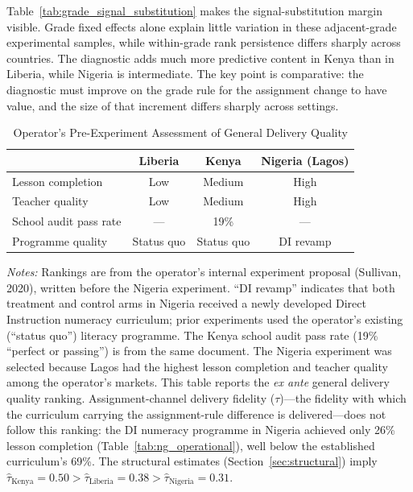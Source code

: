 \documentclass[11pt]{article}
\begin{document}
Table~\ref{tab:grade_signal_substitution} makes the signal-substitution margin visible. Grade fixed effects alone explain little variation in these adjacent-grade experimental samples, while within-grade rank persistence differs sharply across countries. The diagnostic adds much more predictive content in Kenya than in Liberia, while Nigeria is intermediate. The key point is comparative: the diagnostic must improve on the grade rule for the assignment change to have value, and the size of that increment differs sharply across settings.



\begin{table}[H]
\centering
\caption{Operator's Pre-Experiment Assessment of General Delivery Quality}
\label{tab:tau_summary}
\begin{threeparttable}
\begin{tabular}[t]{lccc}
\toprule
 & Liberia & Kenya & Nigeria (Lagos) \\
\midrule
Lesson completion & Low & Medium & High \\
Teacher quality & Low & Medium & High \\
School audit pass rate & --- & 19\% & --- \\
Programme quality & Status quo & Status quo & DI revamp \\
\bottomrule
\end{tabular}
\begin{tablenotes}
\footnotesize
\item \textit{Notes:} Rankings are from the operator's internal experiment proposal (Sullivan, 2020), written before the Nigeria experiment. ``DI revamp'' indicates that both treatment and control arms in Nigeria received a newly developed Direct Instruction numeracy curriculum; prior experiments used the operator's existing (``status quo'') literacy programme. The Kenya school audit pass rate (19\% ``perfect or passing'') is from the same document. The Nigeria experiment was selected because Lagos had the highest lesson completion and teacher quality among the operator's markets. This table reports the \emph{ex ante} general delivery quality ranking. Assignment-channel delivery fidelity ($\tau$)---the fidelity with which the curriculum carrying the assignment-rule difference is delivered---does not follow this ranking: the DI numeracy programme in Nigeria achieved only 26\% lesson completion (Table~\ref{tab:ng_operational}), well below the established curriculum's 69\%. The structural estimates (Section~\ref{sec:structural}) imply $\hat{\tau}_{\text{Kenya}} = 0.50 > \hat{\tau}_{\text{Liberia}} = 0.38 > \hat{\tau}_{\text{Nigeria}} = 0.31$.
\end{tablenotes}
\end{threeparttable}
\end{table}
\end{document}
